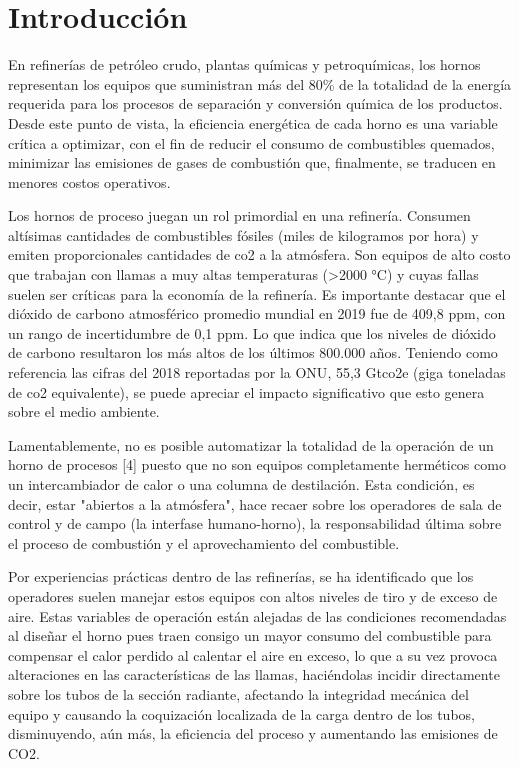 \chapter*{Introducción}

\par En refinerías de petróleo crudo, plantas químicas y petroquímicas, los hornos representan los equipos que suministran más del 80\% de la totalidad de la energía requerida para los procesos de separación y conversión química de los productos. Desde este punto de vista, la eficiencia energética de cada horno es una variable crítica a optimizar, con el fin de reducir el consumo de combustibles quemados, minimizar las emisiones de gases de combustión que, finalmente, se traducen en menores costos operativos\cite{bib:economics}.

\par Los hornos de proceso juegan un rol primordial en una refinería. Consumen altísimas cantidades de combustibles fósiles (miles de kilogramos por hora) y emiten proporcionales cantidades de \ac{co2} a la atmósfera. Son equipos de alto costo que trabajan con llamas a muy altas temperaturas (\textgreater 2000 °C) y cuyas fallas suelen ser críticas para la economía de la refinería. Es importante destacar que el dióxido de carbono atmosférico promedio mundial en 2019 fue de 409,8 ppm, con un rango de incertidumbre de 0,1 ppm. Lo que indica que los niveles de dióxido de carbono resultaron los más altos de los últimos 800.000 años\cite{bib:clima}. Teniendo como referencia las cifras del 2018 reportadas por la \ac{ONU}, 55,3 Gt\ac{co2}e (giga toneladas de \ac{co2} equivalente)\cite{onu}, se puede apreciar el impacto significativo que esto genera sobre el medio ambiente. 

\par Lamentablemente, no es posible automatizar la totalidad de la operación de un horno de procesos [4] puesto que no son equipos completamente herméticos como un intercambiador de calor o una columna de destilación. Esta condición, es decir, estar "abiertos a la atmósfera", hace recaer sobre los operadores de sala de control y de campo (la interfase humano-horno), la responsabilidad última sobre el proceso de combustión y el aprovechamiento del combustible.  

\par Por experiencias prácticas dentro de las refinerías, se ha identificado que los operadores suelen manejar estos equipos con altos niveles de tiro y de exceso de aire. Estas variables de operación están alejadas de las condiciones recomendadas al diseñar el horno pues traen consigo un mayor consumo del combustible para compensar el calor perdido al calentar el aire en exceso, lo que a su vez provoca alteraciones en las características de las llamas, haciéndolas incidir directamente sobre los tubos de la sección radiante, afectando la integridad mecánica del equipo y causando la coquización localizada de la carga dentro de los tubos, disminuyendo, aún más, la eficiencia del proceso y aumentando las emisiones de CO2.


